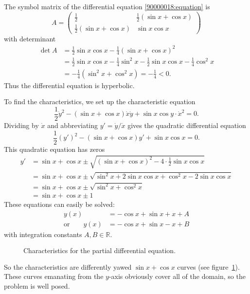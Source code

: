 \begin{loesung}
\begin{teilaufgaben}
\item
The symbol matrix of the differential equation \eqref{90000018:equation} is
\[
A=\begin{pmatrix}
\frac12&\frac12(\sin x+\cos x)\\
\frac12(\sin x+\cos x)&\sin x\cos x
\end{pmatrix}
\]
with determinant
\begin{align*}
\det A
&=
\frac12\sin x\cos x
-
\frac14(\sin x+\cos x)^2
\\
&=
\frac12\sin x\cos x
-\frac14\sin^2 x -\frac12\sin x\cos x -\frac14 \cos^2 x
\\
&=
-\frac14(\sin^2 x + \cos^2 x) =-\frac14 < 0.
\end{align*}
Thus the differential equation is hyperbolic.
\item
To find the characteristics, we set up the characteristic equation
\begin{equation}
\frac12
\dot{y}^2 
-
(\sin x + \cos x) \dot{x}\dot{y}
+
\sin x \cos y \cdot \dot{x}^2
=
0.
\label{90000018:chareq}
\end{equation}
Dividing by $\dot{x}$ and abbreviating $y'=\dot{y}/\dot{x}$ gives the
quadratic differential equation
\[
\frac12 (y')^2 -(\sin x + \cos x) y' + \sin x \cos x = 0.
\]
This quadratic equation has zeros
\begin{align*}
y'
&=
\sin x +\cos x \pm \sqrt{(\sin x + \cos x)^2 - 4\cdot\frac12 \sin x \cos x}
\\
&=
\sin x + \cos x \pm \sqrt{\sin^2 x + 2 \sin x\cos x + \cos^2 x -2\sin x \cos x}
\\
&=
\sin x +\cos x \pm \sqrt{\sin^2 x + \cos^2 x}
\\
&=
\sin x +\cos x \pm 1
\end{align*}
These equations can easily be solved:
\[
\begin{aligned}
y(x) &= -\cos x + \sin x + x + A
\\
\text{or}\qquad
y(x) &= -\cos x + \sin x - x + B
\end{aligned}
\]
with integration constants $A,B\in\mathbb R$.
\begin{figure}
\centering
{}
\caption{Characteristics for the partial differential equation.
\label{90000018:char}}
\end{figure}
So the characteristics are differently yawed $\sin x+\cos x$ curves
(see figure~\ref{90000018:char}).
These curves emanating from the $y$-axis obviously cover all of the domain,
so the problem is well posed.
\qedhere
\end{teilaufgaben}
\end{loesung}

